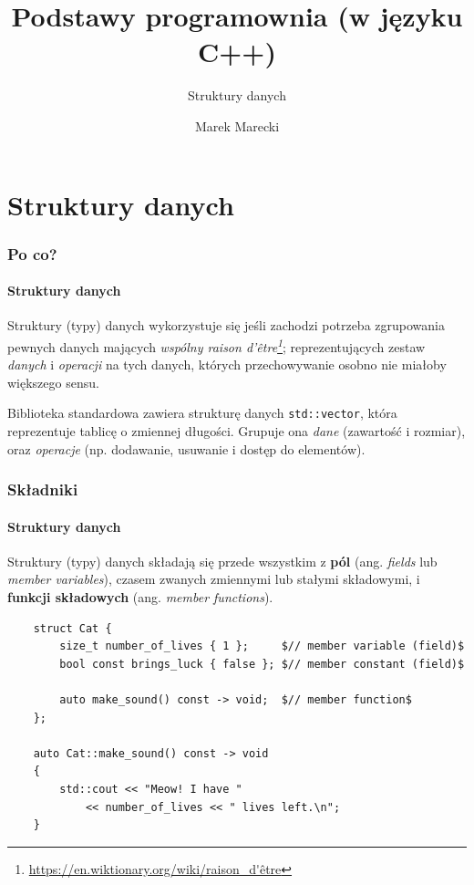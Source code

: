 \documentclass[aspectratio=169]{beamer}
\title{Podstawy programownia (w języku C++)}
\subtitle{Struktury danych}
\author{Marek Marecki}
\institute{Polsko-Japońska Akademia Technik Komputerowych}
\begin{document}
{%
    \frame{\titlepage}
}

\section{Struktury danych}

\begin{frame}
    \frametitle{Po co?}
    \framesubtitle{Struktury danych}

    Struktury (typy) danych wykorzystuje się jeśli zachodzi potrzeba zgrupowania
    pewnych danych mających \emph{wspólny raison
    d'être\footnote{\url{https://en.wiktionary.org/wiki/raison_d'être}}};
    reprezentujących zestaw \emph{danych} i \emph{operacji} na tych danych,
    których przechowywanie osobno nie miałoby większego sensu.

    \vspace{1em}

    Biblioteka standardowa zawiera strukturę danych {\tt std::vector}, która
    reprezentuje tablicę o zmiennej długości. Grupuje ona \emph{dane} (zawartość
    i rozmiar), oraz \emph{operacje} (np. dodawanie, usuwanie i dostęp do
    elementów).
\end{frame}

\begin{frame}[fragile]
    \frametitle{Składniki}
    \framesubtitle{Struktury danych}

    Struktury (typy) danych składają się przede wszystkim z \textbf{pól} (ang.
    \emph{fields} lub \emph{member variables}), czasem zwanych zmiennymi lub
    stałymi składowymi, i \textbf{funkcji składowych} (ang. \emph{member
    functions}).

    {\scriptsize
    \begin{lstlisting}
    struct Cat {
        size_t number_of_lives { 1 };     $// member variable (field)$
        bool const brings_luck { false }; $// member constant (field)$

        auto make_sound() const -> void;  $// member function$
    };

    auto Cat::make_sound() const -> void
    {
        std::cout << "Meow! I have "
            << number_of_lives << " lives left.\n";
    }
    \end{lstlisting}}
\end{frame}
\end{document}
